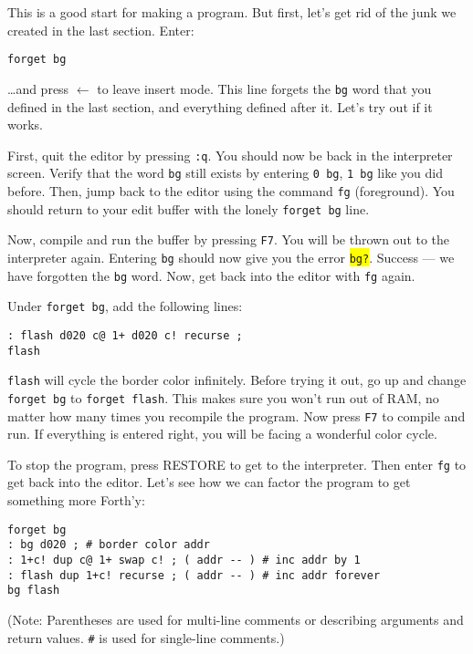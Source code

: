 This is a good start for making a program. But first, let's get rid of the junk we created in the last section. Enter:

\begin{verbatim}
forget bg
\end{verbatim}

\ldots and press $\leftarrow$ to leave insert mode. This line forgets the \texttt{bg} word that you defined in the last section, and everything defined after it. Let's try out if it works.

First, quit the editor by pressing \texttt{:q}. You should now be back in the interpreter screen. Verify that the word \texttt{bg} still exists by  entering \texttt{0 bg}, \texttt{1 bg} like you did before. Then, jump back to the editor using the command \texttt{fg} (foreground). You should return to your edit buffer with the lonely \texttt{forget bg} line.

Now, compile and run the buffer by pressing \texttt{F7}. You will be thrown out to the interpreter again. Entering \texttt{bg} should now give you the error \colorbox{yellow}{\texttt{bg?}}. Success --- we have forgotten the \texttt{bg} word. Now, get back into the editor with \texttt{fg} again.

Under \texttt{forget bg}, add the following lines:

\begin{verbatim}
: flash d020 c@ 1+ d020 c! recurse ;
flash
\end{verbatim}

\texttt{flash} will cycle the border color infinitely. Before trying it out, go up and change \texttt{forget bg} to \texttt{forget flash}. This makes sure you won't run out of RAM, no matter how many times you recompile the program. Now press \texttt{F7} to compile and run. If everything is entered right, you will be facing a wonderful color cycle.

To stop the program, press RESTORE to get to the interpreter. Then enter \texttt{fg} to get back into the editor. Let's see how we can factor the program to get something more Forth'y:

\begin{verbatim}
forget bg
: bg d020 ; # border color addr
: 1+c! dup c@ 1+ swap c! ; ( addr -- ) # inc addr by 1
: flash dup 1+c! recurse ; ( addr -- ) # inc addr forever
bg flash
\end{verbatim}

(Note: Parentheses are used for multi-line comments or describing arguments and return values. \texttt{\#} is used for single-line comments.)

